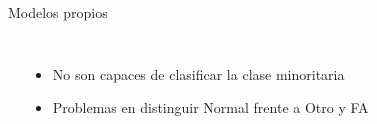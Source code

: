 \begin{frame}{Modelos propios}
\begin{columns}
        \begin{table}[H]
        \vspace{-1cm}
        \caption{GRU}
        \begin{center}
        \end{center}
        \end{table}
        
    \begin{itemize}
        \item No son capaces de clasificar la clase minoritaria
        \item Problemas en distinguir Normal frente a Otro y FA
    \end{itemize}
\end{columns}       
\end{frame}



